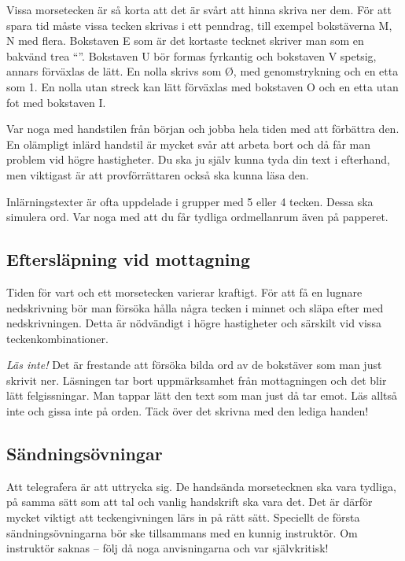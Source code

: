 Vissa morsetecken är så korta att det är svårt att hinna skriva ner dem.
För att spara tid måste vissa tecken skrivas i ett penndrag, till exempel
bokstäverna M, N med flera.
Bokstaven E som är det kortaste tecknet skriver man som en bakvänd trea
``''.
Bokstaven U bör formas fyrkantig och bokstaven V spetsig, annars förväxlas de
lätt.
En nolla skrivs som Ø, med genomstrykning och en etta som 1.
En nolla utan streck kan lätt förväxlas med bokstaven O och en etta utan fot med
bokstaven I.

Var noga med handstilen från början och jobba hela tiden med att förbättra den.
En olämpligt inlärd handstil är mycket svår att arbeta bort och då får man
problem vid högre hastigheter.
Du ska ju själv kunna tyda din text i efterhand, men viktigast är att
provförrättaren också ska kunna läsa den.

Inlärningstexter är ofta uppdelade i grupper med 5 eller 4 tecken.
Dessa ska simulera ord.
Var noga med att du får tydliga ordmellanrum även på papperet.

\subsection[Eftersläpning]{Eftersläpning vid mottagning}

Tiden för vart och ett morsetecken varierar kraftigt.
För att få en lugnare nedskrivning bör man försöka hålla några tecken i minnet
och släpa efter med nedskrivningen.
Detta är nödvändigt i högre hastigheter och särskilt vid vissa
teckenkombinationer.

\emph{Läs inte!}
Det är frestande att försöka bilda ord av de bokstäver som man just skrivit ner.
Läsningen tar bort uppmärksamhet från mottagningen och det blir lätt
felgissningar.
Man tappar lätt den text som man just då tar emot.
Läs alltså inte och gissa inte på orden.
Täck över det skrivna med den lediga handen!

\subsection{Sändningsövningar}

Att telegrafera är att uttrycka sig.
De handsända morsetecknen ska vara tydliga, på samma sätt som att tal och
vanlig handskrift ska vara det.
Det är därför mycket viktigt att teckengivningen lärs in på rätt sätt.
Speciellt de första sändningsövningarna bör ske tillsammans med en kunnig
instruktör.
Om instruktör saknas -- följ då noga anvisningarna och var självkritisk!

